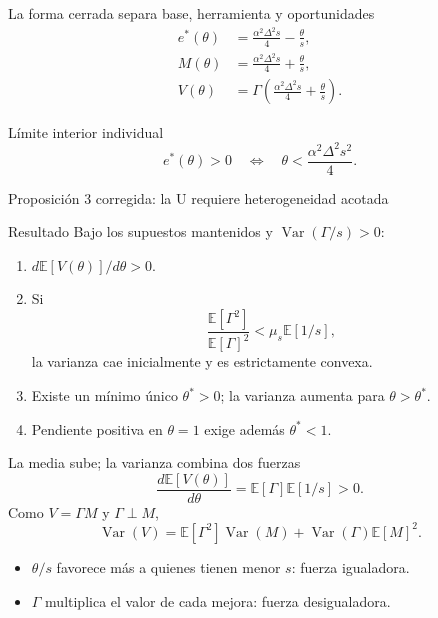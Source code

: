 \documentclass[aspectratio=169,11pt]{beamer}
\begin{document}
\begin{frame}{La forma cerrada separa base, herramienta y oportunidades}
  \begin{align*}
  e^*(\theta)&=\frac{\alpha^2\Delta^2s}{4}-\frac{\theta}{s},\\
  M(\theta)&=\frac{\alpha^2\Delta^2s}{4}+\frac{\theta}{s},\\
  V(\theta)&=\Gamma\left(\frac{\alpha^2\Delta^2s}{4}+\frac{\theta}{s}\right).
  \end{align*}
  \begin{block}{Límite interior individual}
  \[
  e^*(\theta)>0
  \quad\Longleftrightarrow\quad
  \theta<\frac{\alpha^2\Delta^2s^2}{4}.
  \]
  \end{block}
\end{frame}

\begin{frame}{Proposición 3 corregida: la U requiere heterogeneidad acotada}
  \small
  \begin{block}{Resultado}
  Bajo los supuestos mantenidos y $\operatorname{Var}(\Gamma/s)>0$:
  \begin{enumerate}
    \item $d\mathbb E[V(\theta)]/d\theta>0$.
    \item Si
      \[
      \frac{\mathbb E[\Gamma^2]}{\mathbb E[\Gamma]^2}
      <\mu_s\mathbb E[1/s],
      \]
      la varianza cae inicialmente y es estrictamente convexa.
    \item Existe un mínimo único $\theta^*>0$; la varianza aumenta para
      $\theta>\theta^*$.
    \item Pendiente positiva en $\theta=1$ exige además $\theta^*<1$.
  \end{enumerate}
  \end{block}
\end{frame}

\begin{frame}{La media sube; la varianza combina dos fuerzas}
  \[
  \frac{d\mathbb E[V(\theta)]}{d\theta}
  =\mathbb E[\Gamma]\mathbb E[1/s]>0.
  \]
  Como $V=\Gamma M$ y $\Gamma\perp M$,
  \[
  \operatorname{Var}(V)=\mathbb E[\Gamma^2]\operatorname{Var}(M)
  +\operatorname{Var}(\Gamma)\mathbb E[M]^2.
  \]
  \begin{itemize}
    \item $\theta/s$ favorece más a quienes tienen menor $s$: fuerza igualadora.
    \item $\Gamma$ multiplica el valor de cada mejora: fuerza desigualadora.
  \end{itemize}
\end{frame}
\end{document}
